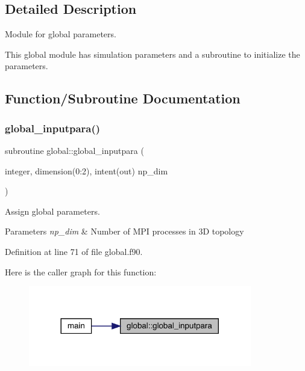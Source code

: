 \subsection{Detailed Description}
Module for global parameters. 

This global module has simulation parameters and a subroutine to initialize the parameters. 

\subsection{Function/\+Subroutine Documentation}
\mbox{\label{namespaceglobal_a930b565da2644b675f35b91735e11ce3}} 
\subsubsection{\texorpdfstring{global\_inputpara()}{global\_inputpara()}}
{\footnotesize\ttfamily subroutine global\+::global\+\_\+inputpara (\begin{DoxyParamCaption}\item[{integer, dimension(0\+:2), intent(out)}]{np\+\_\+dim }\end{DoxyParamCaption})}



Assign global parameters. 


\begin{DoxyParams}{Parameters}
{\em np\+\_\+dim} & Number of M\+PI processes in 3D topology \\
\hline
\end{DoxyParams}


Definition at line 71 of file global.\+f90.

Here is the caller graph for this function\+:
\nopagebreak
\begin{figure}[H]
\begin{center}
\leavevmode
\includegraphics[width=276pt]{namespaceglobal_a930b565da2644b675f35b91735e11ce3_icgraph}
\end{center}
\end{figure}


